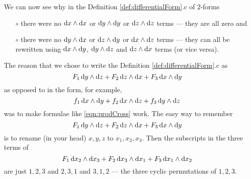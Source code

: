 \begin{eg}
We can now see why in the Definition \ref{def:differentialForm}.c
of $2$-forms
\begin{itemize}\itemsep1pt \parskip0pt  %
\item[$\circ$]
there were no $\mathrm{d}x\wedge\mathrm{d}x$ or
              $\mathrm{d}y\wedge\mathrm{d}y$ or
              $\mathrm{d}z\wedge\mathrm{d}z$ 
terms --- they are all zero and
\item[$\circ$]
there were no $\mathrm{d}y\wedge\mathrm{d}x$ or
              $\mathrm{d}z\wedge\mathrm{d}y$ or
              $\mathrm{d}x\wedge\mathrm{d}z$ 
terms --- they can all be rewritten using 
$\mathrm{d}x\wedge\mathrm{d}y$,
              $\mathrm{d}y\wedge\mathrm{d}z$ and
              $\mathrm{d}z\wedge\mathrm{d}x$ 
terms (or vice versa).
\end{itemize}
The reason that we chose to write the Definition \ref{def:differentialForm}.c
as\begin{equation*}
 F_1\,\mathrm{d}y\wedge\mathrm{d}z
 + F_2\,\mathrm{d}z\wedge\mathrm{d}x
 + F_3\,\mathrm{d}x\wedge\mathrm{d}y
\end{equation*}
as opposed to in the form, for example,
\begin{equation*}
 f_1\,\mathrm{d}x\wedge\mathrm{d}y
 + f_2\,\mathrm{d}x\wedge\mathrm{d}z
 + f_3\,\mathrm{d}y\wedge\mathrm{d}z
\end{equation*}
was to make formulae like \eqref{eqn:prodCross} work. 
The easy way to remember
\begin{equation*}
 F_1\,\mathrm{d}y\wedge\mathrm{d}z
 + F_2\,\mathrm{d}z\wedge\mathrm{d}x
 + F_3\,\mathrm{d}x\wedge\mathrm{d}y
\end{equation*}
is to rename (in your head) $x,y,z$ to $x_1,x_2,x_3$. Then the subscripts
in the three terms of 
\begin{equation*}
 F_1\,\mathrm{d}x_2\wedge\mathrm{d}x_3
 + F_2\,\mathrm{d}x_3\wedge\mathrm{d}x_1
 + F_3\,\mathrm{d}x_1\wedge\mathrm{d}x_2
\end{equation*}
are just $1,2,3$ and $2,3,1$ and $3,1,2$ --- the three cyclic permutations
of $1,2,3$.
\end{eg}

